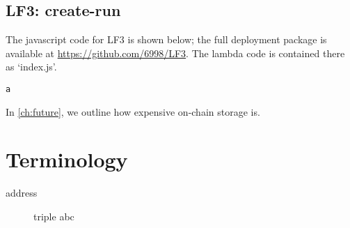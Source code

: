 \documentclass[12pt,oneside]{amsart}
\begin{document}
\subsection{LF3: create-run} \label{code:lf3}
The javascript code for LF3 is shown below; the full deployment package is available at \url{https://github.com/6998/LF3}.
The lambda code is contained there as `index.js'.

\begin{Verbatim}[fontsize=\tiny, frame=single]
  a
\end{Verbatim}

In \ref{ch:future}, we outline how expensive on-chain storage is.

\section{Terminology} \label{ch:Terminology}

\begin{description}
\item[address] triple abc
\end{description}

\appendix
\end{document}

